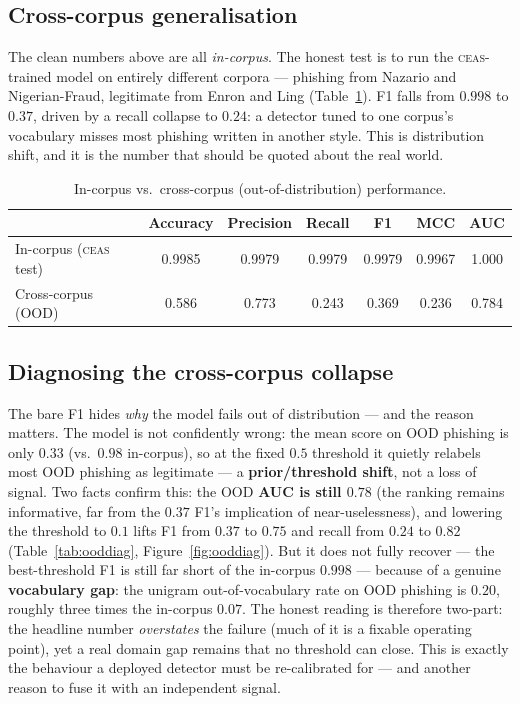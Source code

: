 \documentclass[11pt]{article}
\begin{document}
\subsection{Cross-corpus generalisation}
The clean numbers above are all \emph{in-corpus}. The honest test is to run the
\textsc{ceas}-trained model on entirely different corpora --- phishing from Nazario
and Nigerian-Fraud, legitimate from Enron and Ling (Table~\ref{tab:xcorp}). F1 falls
from $0.998$ to $0.37$, driven by a recall collapse to $0.24$: a detector tuned to
one corpus's vocabulary misses most phishing written in another style. This is
distribution shift, and it is the number that should be quoted about the real world.

\begin{table}[t]
\centering
\caption{In-corpus vs.\ cross-corpus (out-of-distribution) performance.}
\label{tab:xcorp}
\begin{tabular}{lcccccc}
\toprule
 & Accuracy & Precision & Recall & F1 & MCC & AUC \\
\midrule
In-corpus (\textsc{ceas} test)   & 0.9985 & 0.9979 & 0.9979 & 0.9979 & 0.9967 & 1.000 \\
Cross-corpus (OOD)               & 0.586  & 0.773  & 0.243  & 0.369  & 0.236  & 0.784 \\
\bottomrule
\end{tabular}
\end{table}

\subsection{Diagnosing the cross-corpus collapse}
\label{sec:xcorp-diag}
The bare F1 hides \emph{why} the model fails out of distribution --- and the reason
matters. The model is not confidently wrong: the mean score on OOD phishing is only
$0.33$ (vs.\ $0.98$ in-corpus), so at the fixed $0.5$ threshold it quietly relabels most
OOD phishing as legitimate --- a \textbf{prior/threshold shift}, not a loss of signal.
Two facts confirm this: the OOD \textbf{AUC is still $0.78$} (the ranking remains
informative, far from the $0.37$ F1's implication of near-uselessness), and lowering the
threshold to $0.1$ lifts F1 from $0.37$ to $0.75$ and recall from $0.24$ to $0.82$
(Table~\ref{tab:ooddiag}, Figure~\ref{fig:ooddiag}). But it does not fully recover ---
the best-threshold F1 is still far short of the in-corpus $0.998$ --- because of a
genuine \textbf{vocabulary gap}: the unigram out-of-vocabulary rate on OOD phishing is
$0.20$, roughly three times the in-corpus $0.07$. The honest reading is therefore
two-part: the headline number \emph{overstates} the failure (much of it is a fixable
operating point), yet a real domain gap remains that no threshold can close. This is
exactly the behaviour a deployed detector must be re-calibrated for --- and another
reason to fuse it with an independent signal.
\end{document}
